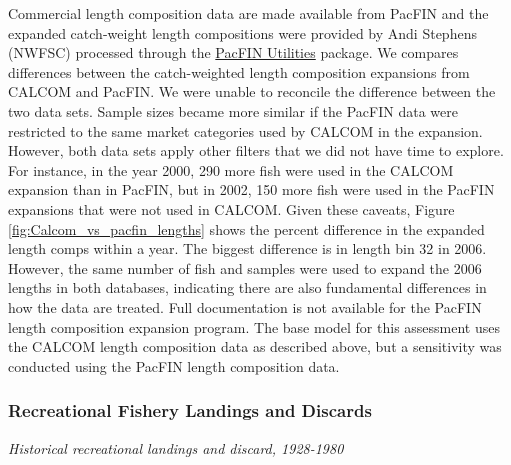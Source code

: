 \documentclass[12pt,]{article}
\begin{document}
Commercial length composition data are made available from PacFIN and
the expanded catch-weight length compositions were provided by Andi
Stephens (NWFSC) processed through the
\href{https://github.com/nwfsc-assess/PacFIN.Utilities}{PacFIN
Utilities} package. We compares differences between the catch-weighted
length composition expansions from CALCOM and PacFIN. We were unable to
reconcile the difference between the two data sets. Sample sizes became
more similar if the PacFIN data were restricted to the same market
categories used by CALCOM in the expansion. However, both data sets
apply other filters that we did not have time to explore. For instance,
in the year 2000, 290 more fish were used in the CALCOM expansion than
in PacFIN, but in 2002, 150 more fish were used in the PacFIN expansions
that were not used in CALCOM. Given these caveats, Figure
\ref{fig:Calcom_vs_pacfin_lengths} shows the percent difference in the
expanded length comps within a year. The biggest difference is in length
bin 32 in 2006. However, the same number of fish and samples were used
to expand the 2006 lengths in both databases, indicating there are also
fundamental differences in how the data are treated. Full documentation
is not available for the PacFIN length composition expansion program.
The base model for this assessment uses the CALCOM length composition
data as described above, but a sensitivity was conducted using the
PacFIN length composition data.

\subsubsection{Recreational Fishery Landings and
Discards}\label{recreational-fishery-landings-and-discards}

\emph{Historical recreational landings and discard, 1928-1980}
\end{document}
